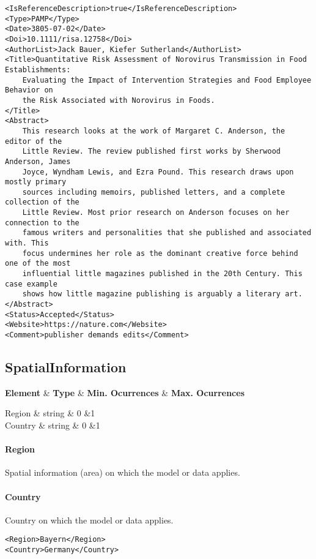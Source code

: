 \documentclass[a4paper]{report}
\def\starttable{%
    \tabular{|l|c|c|c|}
    \hline
    \textbf{Element} & \textbf{Type} & \textbf{Min. Ocurrences} & \textbf{Max. Ocurrences} \\    
    \hline
}
\def\stoptable{%
    \hline \endtabular
}
\def\R #1|#2|#3|#4{ #1&#2&#3&#4 \\}
\begin{document}
\begin{lstlisting}[language=RAKIP, caption={Example of Reference}]
<IsReferenceDescription>true</IsReferenceDescription>
<Type>PAMP</Type>
<Date>3805-07-02</Date>
<Doi>10.1111/risa.12758</Doi>
<AuthorList>Jack Bauer, Kiefer Sutherland</AuthorList>
<Title>Quantitative Risk Assessment of Norovirus Transmission in Food Establishments:
    Evaluating the Impact of Intervention Strategies and Food Employee Behavior on
    the Risk Associated with Norovirus in Foods.
</Title>
<Abstract>
    This research looks at the work of Margaret C. Anderson, the editor of the
    Little Review. The review published first works by Sherwood Anderson, James
    Joyce, Wyndham Lewis, and Ezra Pound. This research draws upon mostly primary
    sources including memoirs, published letters, and a complete collection of the
    Little Review. Most prior research on Anderson focuses on her connection to the
    famous writers and personalities that she published and associated with. This
    focus undermines her role as the dominant creative force behind one of the most
    influential little magazines published in the 20th Century. This case example
    shows how little magazine publishing is arguably a literary art.
</Abstract>
<Status>Accepted</Status>
<Website>https://nature.com</Website>
<Comment>publisher demands edits</Comment>
\end{lstlisting}

\subsection{SpatialInformation}

\starttable
    \R Region | string | 0 | 1
    \R Country | string | 0 | 1
\stoptable

\paragraph{Region}
Spatial information (area) on which the model or data applies.

\paragraph{Country}
Country on which the model or data applies.

\begin{lstlisting}[language=RAKIP, caption={Example of SpatialInformation}]
<Region>Bayern</Region>
<Country>Germany</Country>
\end{lstlisting}
\end{document}
